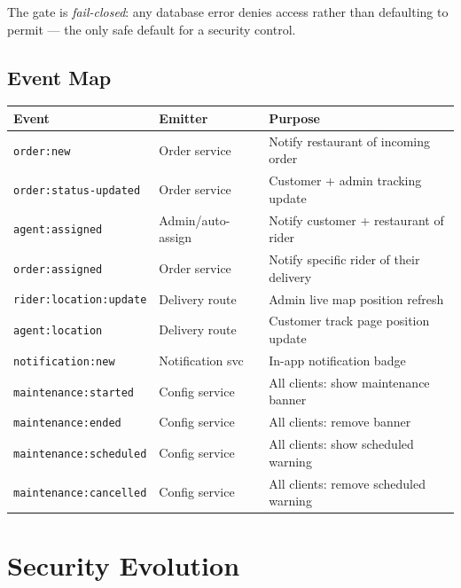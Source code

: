 \documentclass[11pt,a4paper,twoside]{book}
\newcommand{\th}[1]{\textbf{\color{white}#1}}
\begin{document}
The gate is \emph{fail-closed}: any database error denies access rather than
defaulting to permit — the only safe default for a security control.

\section{Event Map}

\begin{center}\small
\begin{tabular}{p{3.8cm}p{3.5cm}p{5.5cm}}
\toprule
\rowcolor{headbg}\th{Event} & \th{Emitter} & \th{Purpose} \\
\midrule
\texttt{order:new}            & Order service      & Notify restaurant of incoming order \\
\rowcolor{rowalt}\texttt{order:status-updated} & Order service      & Customer + admin tracking update \\
\texttt{agent:assigned}       & Admin/auto-assign  & Notify customer + restaurant of rider \\
\rowcolor{rowalt}\texttt{order:assigned}        & Order service      & Notify specific rider of their delivery \\
\texttt{rider:location:update} & Delivery route    & Admin live map position refresh \\
\rowcolor{rowalt}\texttt{agent:location}        & Delivery route     & Customer track page position update \\
\texttt{notification:new}     & Notification svc   & In-app notification badge \\
\rowcolor{rowalt}\texttt{maintenance:started}   & Config service     & All clients: show maintenance banner \\
\texttt{maintenance:ended}    & Config service     & All clients: remove banner \\
\rowcolor{rowalt}\texttt{maintenance:scheduled} & Config service     & All clients: show scheduled warning \\
\texttt{maintenance:cancelled}& Config service     & All clients: remove scheduled warning \\
\bottomrule
\end{tabular}
\end{center}

\chapter{Security Evolution}
\end{document}
